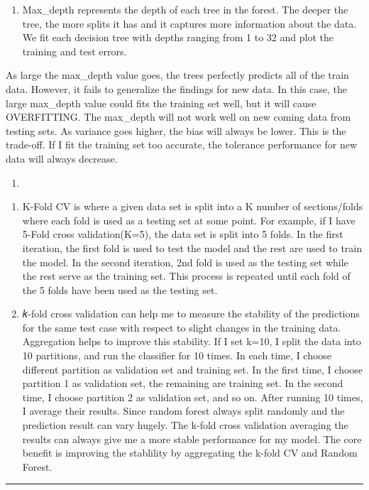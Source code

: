 \documentclass[11pt]{article}
\providecommand{\tightlist}{%
      \setlength{\itemsep}{0pt}\setlength{\parskip}{0pt}}
\begin{document}
    \begin{enumerate}
\def\labelenumi{\alph{enumi})}
\setcounter{enumi}{4}
\tightlist
\item
  Max\_depth represents the depth of each tree in the forest. The deeper
  the tree, the more splits it has and it captures more information
  about the data. We fit each decision tree with depths ranging from 1
  to 32 and plot the training and test errors.
\end{enumerate}

As large the max\_depth value goes, the trees perfectly predicts all of
the train data. However, it fails to generalize the findings for new
data. In this case, the large max\_depth value could fits the training
set well, but it will cause OVERFITTING. The max\_depth will not work
well on new coming data from testing sets. As variance goes higher, the
bias will always be lower. This is the trade-off. If I fit the training
set too accurate, the tolerance performance for new data will always
decrease.

    \begin{enumerate}
\def\labelenumi{\alph{enumi})}
\setcounter{enumi}{5}
\item
\end{enumerate}

\begin{enumerate}
\def\labelenumi{\arabic{enumi})}
\item
  K-Fold CV is where a given data set is split into a K number of
  sections/folds where each fold is used as a testing set at some point.
  For example, if I have 5-Fold cross validation(K=5), the data set is
  split into 5 folds. In the first iteration, the first fold is used to
  test the model and the rest are used to train the model. In the second
  iteration, 2nd fold is used as the testing set while the rest serve as
  the training set. This process is repeated until each fold of the 5
  folds have been used as the testing set.
\item
  𝑘-fold cross validation can help me to measure the stability of the
  predictions for the same test case with respect to slight changes in
  the training data. Aggregation helps to improve this stability. If I
  set k=10, I split the data into 10 partitions, and run the classifier
  for 10 times. In each time, I choose different partition as validation
  set and training set. In the first time, I choose partition 1 as
  validation set, the remaining are training set. In the second time, I
  choose partition 2 as validation set, and so on. After running 10
  times, I average their results. Since random forest always split
  randomly and the prediction result can vary hugely. The k-fold cross
  validation averaging the results can always give me a more stable
  performance for my model. The core benefit is improving the stablility
  by aggregating the k-fold CV and Random Forest.
\end{enumerate}

    \begin{center}\rule{0.5\linewidth}{\linethickness}\end{center}


    
    
    
    
\end{document}
